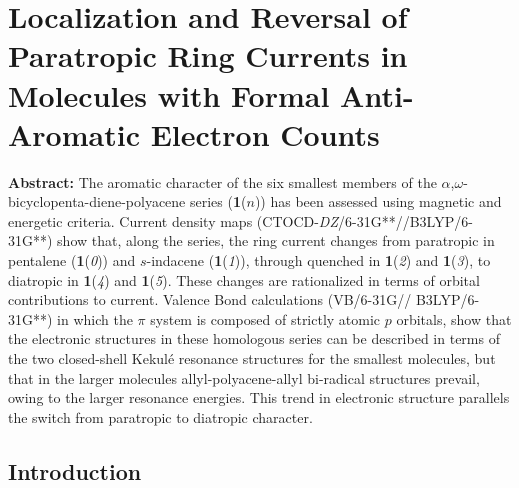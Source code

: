\chapter{Localization and Reversal of Paratropic Ring Currents in Molecules with Formal Anti-Aromatic Electron Counts}
\label{chap_indacene}


\noindent\textbf{Abstract:} The aromatic character of the six smallest members of the $\alpha$,$\omega$-bicyclopenta-diene-polyacene series (\textbf{1}($n$)) has been assessed using magnetic and energetic criteria. Current density maps (CTOCD-\textit{DZ}/6-31G**//B3LYP/6-31G**) show that, along the series, the ring current changes from paratropic in pentalene (\textbf{1}(\textit{0})) and $s$-indacene (\textbf{1}(\textit{1})), through quenched in \textbf{1}(\textit{2}) and \textbf{1}(\textit{3}), to diatropic in \textbf{1}(\textit{4}) and \textbf{1}(\textit{5}). These changes are rationalized in terms of orbital contributions to current. Valence Bond calculations (VB/\mbox{6-31G}// B3LYP/\mbox{6-31G**}) in which the $\pi$ system is composed of strictly atomic $p$ orbitals, show that the electronic structures in these homologous series can be described in terms of the two closed-shell Kekul\'e resonance structures for the smallest molecules, but that in the larger molecules allyl-polyacene-allyl bi-radical structures prevail, owing to the larger resonance energies. This trend in electronic structure parallels the switch from paratropic to diatropic character.

\newpage

\section{Introduction}

